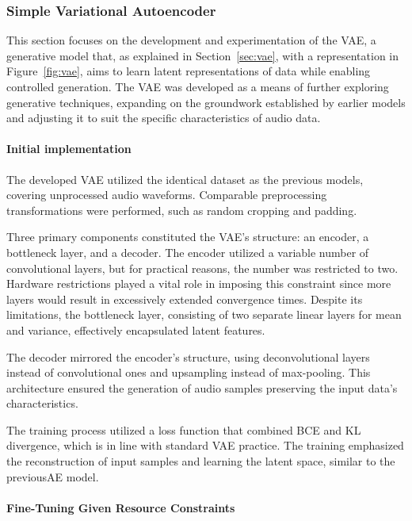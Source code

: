 \subsubsection{Simple Variational Autoencoder} \label{sec:training-vae}

This section focuses on the development and experimentation of the \ac{VAE}, a generative model that, as explained in Section~\ref{sec:vae}, with a representation in Figure~\ref{fig:vae}, aims to learn latent representations of data while enabling controlled generation. The \ac{VAE} was developed as a means of further exploring generative techniques, expanding on the groundwork established by earlier models and adjusting it to suit the specific characteristics of audio data.

\paragraph{Initial implementation}

The developed \ac{VAE} utilized the identical dataset as the previous models, covering unprocessed audio waveforms. Comparable preprocessing transformations were performed, such as random cropping and padding.

Three primary components constituted the \ac{VAE}'s structure: an encoder, a bottleneck layer, and a decoder. The encoder utilized a variable number of convolutional layers, but for practical reasons, the number was restricted to two. Hardware restrictions played a vital role in imposing this constraint since more layers would result in excessively extended convergence times. Despite its limitations, the bottleneck layer, consisting of two separate linear layers for mean and variance, effectively encapsulated latent features.

The decoder mirrored the encoder's structure, using deconvolutional layers instead of convolutional ones and upsampling instead of max-pooling. This architecture ensured the generation of audio samples preserving the input data's characteristics.

The training process utilized a loss function that combined \ac{BCE} and \ac{KL} divergence, which is in line with standard \ac{VAE} practice. The training emphasized the reconstruction of input samples and learning the latent space, similar to the previous\ac{AE} model.

\paragraph{Fine-Tuning Given Resource Constraints}

